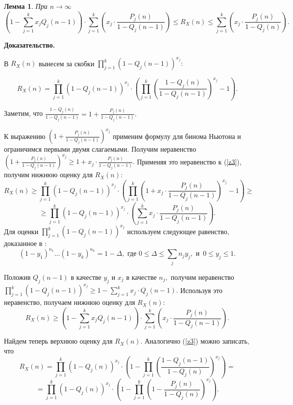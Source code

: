 \documentclass[%
11pt,a4paper]{article}
\begin{document}
{{{\medskip

\textbf{Лемма 1}.
{\em
При $n \rightarrow \infty$
\begin{equation}
\left(1-\sum_{j=1}^k x_j Q_j(n-1)\right) \cdot \sum_{j=1}^k \left(x_j \cdot \frac {P_j(n)}{1-Q_j(n-1)} \right)\le R_X(n) \le
\sum_{j=1}^k \left(x_j \cdot \frac{P_j(n)}{1-Q_j(n)}\right).
\label{z2}
\end{equation}
\/}

\medskip

{\bf Доказательство.}

В $R_X(n)$ вынесем за скобки $\prod_{j=1}^k \left(1-Q_j(n-1)\right)^{x_j}:$ 

\begin{equation}
R_X(n)=\prod_{j=1}^k \left(1-Q_j(n-1)\right)^{x_j} \cdot  \left( \prod_{j=1}^k \left(\frac{1-Q_j(n)}{1-Q_j(n-1)} \right)^{x_j}-1\right).
\label{z3}
\end{equation}

Заметим, что $\frac{1-Q_j(n)}{1-Q_j(n-1)}=1+\frac {P_j(n)}{1-Q_j(n-1)}.$

К выражению $\left(1+\frac {P_j(n)}{1-Q_j(n-1)}\right)^{x_j}$ применим формулу для бинома Ньютона и ограничимся первыми двумя слагаемыми. Получим неравенство $\left(1+\frac {P_j(n)}{1-Q_j(n-1)}\right)^{x_j} \geq 1+ x_j \cdot \frac {P_j(n)}{1-Q_j(n-1)}.$ Применяя это неравенство к (\ref{z3}), получим нижнюю оценку для $R_X(n):$
$$
R_X(n)\geq \prod_{j=1}^k \left(1-Q_j(n-1)\right)^{x_j} \cdot\left( \prod_{j=1}^k \left(1+x_j \cdot \frac {P_j(n)}{1-Q_j(n-1)}\right)^{x_j} -1 \right) \geq 
$$
$$
\geq \prod_{j=1}^k \left(1 -Q_j(n-1)\right)^{x_j} \cdot \left( \sum_{j=1}^k x_j \cdot \frac {P_j(n)}{1-Q_j(n-1)} \right).
$$
Для оценки $\prod_{j=1}^k \left(1 -Q_j(n-1)\right)^{x_j}$ используем следующее равенство, доказанное в \cite{sev}:
\begin{equation}
(1-y_1)^{n_1} \ldots (1-y_k)^{n_k}=
1- \Delta, \,\,
\mbox{где} \,\, 0 \le \Delta \le \sum_{j}n_j y_j, \, \, \mbox{и} \,\, \, 0\leq y_j\leq 1.
\label{z4}
\end{equation}

Положив $Q_j(n-1)$ в качестве $y_j$ и $x_j$ в качестве $n_j,$ получим неравенство
 $\prod_{j=1}^k \left(1 -Q_j(n-1)\right)^{x_j} \geq 1-\sum_{j=1}^k x_j \cdot Q_j(n-1).$
Используя это неравенство, получаем нижнюю оценку для $R_X(n):$
$$
R_X(n)\geq 
\left(1-\sum_{j=1}^k x_j Q_j(n-1)\right) \cdot \sum_{j=1}^k \left(x_j \cdot \frac {P_j(n)}{1-Q_j(n-1)} \right).
$$

Найдем теперь верхнюю оценку для $R_X(n).$
Аналогично (\ref{z3}) можно записать, что
$$
R_X(n)=\prod_{j=1}^k \left(1-Q_j(n)\right)^{x_j} \cdot  \left(1- \prod_{j=1}^k \left(\frac{1-Q_j(n-1)}{1-Q_j(n)} \right)^{x_j}\right)=
$$
\begin{equation}
=\prod_{j=1}^k \left(1-Q_j(n)\right)^{x_j} \cdot  \left(1- \prod_{j=1}^k \left(1-\frac {P_j(n)}{1-Q_j(n)}\right)^{x_j}\right).
\label{z5}
\end{equation}

}}}
\end{document}
